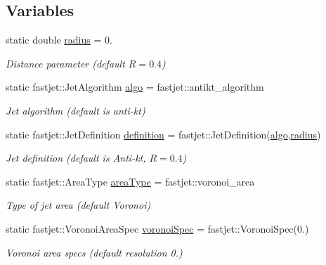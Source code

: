 \subsection*{Variables}
\begin{DoxyCompactItemize}
\item 
static double \hyperlink{namespaceAnalysis_1_1Config_1_1TruthJet_a6a947195217aef2c4d4c6360017bab95}{radius} = 0.
\begin{DoxyCompactList}\small\item\em Distance parameter (default $ R = 0.4 $) \end{DoxyCompactList}\item 
static fastjet\+::\+Jet\+Algorithm \hyperlink{namespaceAnalysis_1_1Config_1_1TruthJet_ac60138634b23bdc579520adf99f9393f}{algo} = fastjet\+::antikt\+\_\+algorithm
\begin{DoxyCompactList}\small\item\em Jet algorithm (default is anti-\/kt) \end{DoxyCompactList}\item 
static fastjet\+::\+Jet\+Definition \hyperlink{namespaceAnalysis_1_1Config_1_1TruthJet_a15280a9c639a88c02bf1e3794b6ec29d}{definition} = fastjet\+::\+Jet\+Definition(\hyperlink{namespaceAnalysis_1_1Config_1_1TruthJet_ac60138634b23bdc579520adf99f9393f}{algo},\hyperlink{namespaceAnalysis_1_1Config_1_1TruthJet_a6a947195217aef2c4d4c6360017bab95}{radius})
\begin{DoxyCompactList}\small\item\em Jet definition (default is Anti-\/kt, $ R = 0.4 $) \end{DoxyCompactList}\item 
static fastjet\+::\+Area\+Type \hyperlink{namespaceAnalysis_1_1Config_1_1TruthJet_a1d08c937d56d2b35cdc78f99825a6af2}{area\+Type} = fastjet\+::voronoi\+\_\+area
\begin{DoxyCompactList}\small\item\em Type of jet area (default Voronoi) \end{DoxyCompactList}\item 
static fastjet\+::\+Voronoi\+Area\+Spec \hyperlink{namespaceAnalysis_1_1Config_1_1TruthJet_aacd5481a0b6ada44cb0c879204391075}{voronoi\+Spec} = fastjet\+::\+Voronoi\+Spec(0.)
\begin{DoxyCompactList}\small\item\em Voronoi area specs (default resolution 0.) \end{DoxyCompactList}\item 

\end{DoxyCompactItemize}
